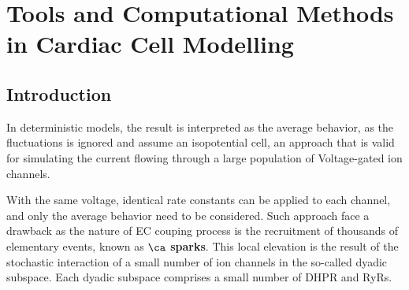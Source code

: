 
\chapter{Tools and Computational Methods in Cardiac Cell Modelling}
\label{chap:comp-meth-card}

\section{Introduction}
\label{sec:introduction-1}

In deterministic models, the result is interpreted as the average
behavior, as the fluctuations is ignored and assume an isopotential
cell, an approach that is valid for simulating the current flowing
through a large population of Voltage-gated ion channels. 

With the same voltage, identical rate constants can be applied to each
channel, and only the average behavior need to be considered. Such
approach face a drawback as the nature of EC couping process is the
recruitment of thousands of elementary events, known as
{\bf $\ca$ sparks}. This local elevation is the result of the
stochastic interaction of a small number of ion channels in the
so-called dyadic subspace. Each dyadic subspace comprises a small
number of DHPR and RyRs.

